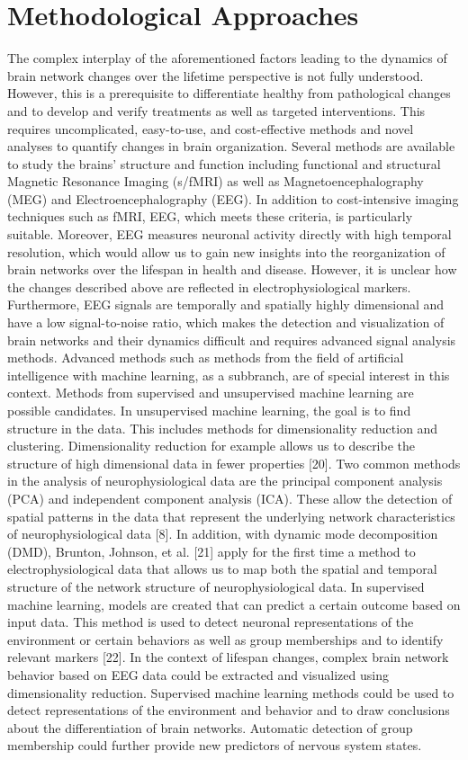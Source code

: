 \section{Methodological Approaches}
The complex interplay of the aforementioned factors leading to the dynamics of brain network changes over the lifetime perspective is not fully understood. However, this is a prerequisite to differentiate healthy from pathological changes and to develop and verify treatments as well as targeted interventions. This requires uncomplicated, easy-to-use, and cost-effective methods and novel analyses to quantify changes in brain organization. Several methods are available to study the brains' structure and function including functional and structural Magnetic Resonance Imaging (s/fMRI) as well as Magnetoencephalography (MEG) and Electroencephalography (EEG). In addition to cost-intensive imaging techniques such as fMRI, EEG, which meets these criteria, is particularly suitable.
Moreover, EEG measures neuronal activity directly with high temporal resolution, which would allow us to gain new insights into the reorganization of brain networks over the lifespan in health and disease. However, it is unclear how the changes described above are reflected in electrophysiological markers. Furthermore, EEG signals are temporally and spatially highly dimensional and have a low signal-to-noise ratio, which makes the detection and visualization of brain networks and their dynamics difficult and requires advanced signal analysis methods. 
Advanced methods such as methods from the field of artificial intelligence with machine learning, as a subbranch, are of special interest in this context. Methods from supervised and unsupervised machine learning are possible candidates. In unsupervised machine learning, the goal is to find structure in the data. This includes methods for dimensionality reduction and clustering. Dimensionality reduction for example allows us to describe the structure of high dimensional data in fewer properties [20]. Two common methods in the analysis of neurophysiological data are the principal component analysis (PCA) and independent component analysis (ICA). These allow the detection of spatial patterns in the data that represent the underlying network characteristics of neurophysiological data [8]. In addition, with dynamic mode decomposition (DMD), Brunton, Johnson, et al. [21] apply for the first time a method to electrophysiological data that allows us to map both the spatial and temporal structure of the network structure of neurophysiological data.
In supervised machine learning, models are created that can predict a certain outcome based on input data. This method is used to detect neuronal representations of the environment or certain behaviors as well as group memberships and to identify relevant markers [22].
In the context of lifespan changes, complex brain network behavior based on EEG data could be extracted and visualized using dimensionality reduction. Supervised machine learning methods could be used to detect representations of the environment and behavior and to draw conclusions about the differentiation of brain networks. Automatic detection of group membership could further provide new predictors of nervous system states.
